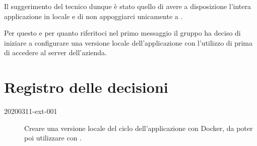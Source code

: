 \documentclass{article}
\begin{document}
Il suggerimento del tecnico dunque è stato quello di avere a disposizione l'intera applicazione in locale e di non appoggiarci unicamente a .

Per questo e per quanto riferitoci nel primo messaggio il gruppo ha deciso di iniziare a configurare una versione locale dell'applicazione con l'utilizzo di  prima di accedere al server dell'azienda.


\newpage
\section{Registro delle decisioni}%
\label{sec:registro_delle_decisioni}

\begin{description}
  \item[20200311-ext-001] Creare una versione locale del ciclo dell'applicazione con Docker, da poter poi utilizzare con .
\end{description}
\end{document}
